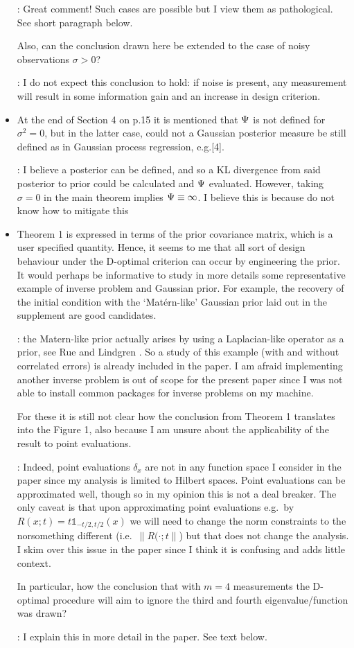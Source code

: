 \documentclass{amsart}
\begin{document}
\begin{itemize}
  \answer: Great comment! Such cases are possible but I view them as
  pathological. See short paragraph below.


  Also, can the conclusion drawn here be extended to the
  case of noisy observations $\sigma > 0$?

  \answer: I do not expect this conclusion to hold: if noise is
  present, any measurement will result in some information gain and an
  increase in design criterion.

  
\item At the end of Section 4 on p.15 it is mentioned that $\Psi$ is not
  defined for $\sigma^2= 0$, but in the latter case, could not a Gaussian
  posterior measure be still defined as in Gaussian process
  regression, e.g.[4].

  \answer: I believe a posterior can be defined, and so a KL
  divergence from said posterior to prior could be calculated and
  $\Psi$ evaluated. However, taking $\sigma = 0$ in the main theorem
  implies $\Psi \equiv \infty$. I believe this is because do not know
  how to mitigate this
  
\item Theorem 1 is expressed in terms of the prior covariance matrix,
  which is a user specified quantity. Hence, it seems to me that all
  sort of design behaviour under the D-optimal criterion can occur by
  engineering the prior. It would perhaps be informative to study in
  more details some representative example of inverse problem and
  Gaussian prior. For example, the recovery of the initial condition
  with the ‘Matérn-like’ Gaussian prior laid out in the supplement are
  good candidates.

  \answer: the Matern-like prior actually arises by using a
  Laplacian-like operator as a prior, see Rue and Lindgren \cite{}. So
  a study of this example (with and without correlated errors) is
  already included in the paper. I am afraid implementing another
  inverse problem is out of scope for the present paper since I was
  not able to install common packages for inverse problems on my machine.

  For these it is still not clear how the conclusion from Theorem 1
  translates into the Figure 1, also because I am unsure about the
  applicability of the result to point evaluations.

  \answer: Indeed, point evaluations $\delta_x$ are not in any
  function space I consider in the paper since my analysis is limited
  to Hilbert spaces. Point evaluations can be approximated well,
  though so in my opinion this is not a deal breaker. The only caveat
  is that upon approximating point evaluations e.g.~by $R(x;t) =
  t\mathbb{1}_{-t/2, t/2}(x)$ we will need to change the norm
  constraints to the norsomething different (i.e.~$\|R(\cdot;t\|$) but
  that does not change the analysis. I skim over this issue in the
  paper since I think it is confusing and adds little context.
  
  In particular, how the conclusion that with $m = 4$ measurements the
  D-optimal procedure will aim to ignore the third and fourth
  eigenvalue/function was drawn?

  \answer: I explain this in more detail in the paper. See text below.

  
\end{itemize}
\end{document}
